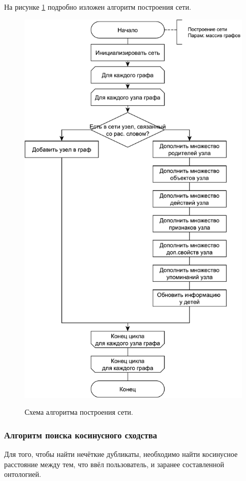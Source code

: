 На рисунке \ref{fig34:image} подробно изложен алгоритм построения сети.
\begin{figure}[h!]
	\begin{center}
		{\includegraphics[scale = 0.6]{img/schemes/pdf/net.pdf}}
		\caption{Схема алгоритма построения сети.}
		\label{fig34:image}
	\end{center}
\end{figure}

\newpage

\subsubsection{Алгоритм поиска косинусного сходства}
Для того, чтобы найти нечёткие дубликаты, необходимо найти косинусное расстояние между тем, что ввёл пользователь, и заранее составленной онтологией.

